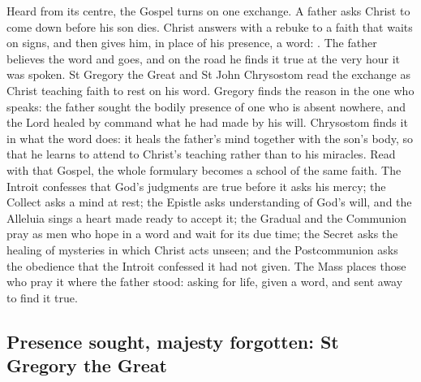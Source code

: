 \label{sec:word-at-a-distance}

Heard from its centre, the Gospel turns on one exchange. A father asks Christ to
come down before his son dies. Christ answers with a rebuke to a faith that
waits on signs, and then gives him, in place of his presence, a word: . The father believes the word and goes, and on the road he
finds it true at the very hour it was spoken. St Gregory the Great and St John
Chrysostom read the exchange as Christ teaching faith to rest on his word.
Gregory finds the reason in the one who speaks: the father sought the bodily
presence of one who is absent nowhere, and the Lord healed by command what he
had made by his will. Chrysostom finds it in what the word does: it heals the
father's mind together with the son's body, so that he learns to attend to
Christ's teaching rather than to his miracles. Read with that Gospel, the whole
formulary becomes a school of the same faith. The Introit confesses that God's
judgments are true before it asks his mercy; the Collect asks a mind at rest;
the Epistle asks understanding of God's will, and the Alleluia sings a heart
made ready to accept it; the Gradual and the Communion
pray as men who hope in a word and wait for its due time; the Secret asks the
healing of mysteries in which Christ acts unseen; and the Postcommunion asks the
obedience that the Introit confessed it had not given. The Mass places those
who pray it where the father stood: asking for life, given a word, and sent
away to find it true.

\subsection{Presence sought, majesty forgotten: St Gregory the Great}

